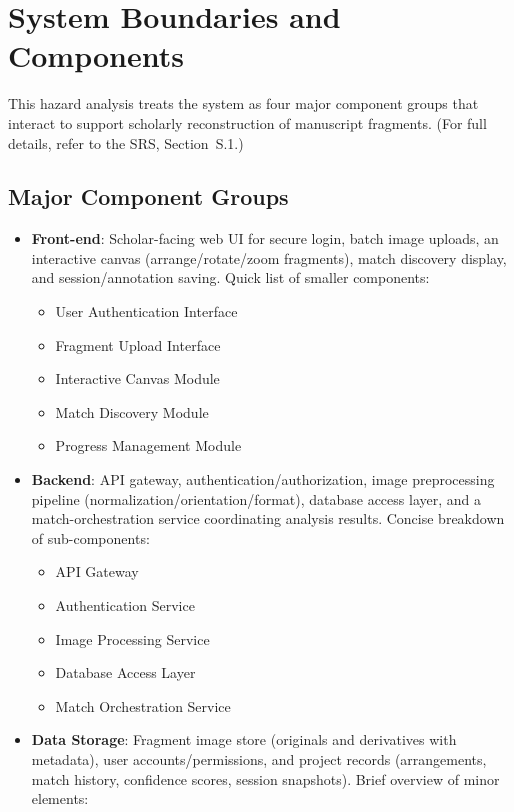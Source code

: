 \documentclass{article}
\begin{document}
\section{System Boundaries and Components}

This hazard analysis treats the system as four major component groups that interact to support scholarly reconstruction of manuscript fragments. (For full details, refer to the SRS, Section~S.1.)

\subsection*{Major Component Groups}
\begin{itemize}
  \item \textbf{Front-end}: Scholar-facing web UI for secure login, batch image uploads, an interactive canvas (arrange/rotate/zoom fragments), match discovery display, and session/annotation saving. Quick list of smaller components:
  \begin{itemize}
    \item User Authentication Interface
    \item Fragment Upload Interface
    \item Interactive Canvas Module
    \item Match Discovery Module
    \item Progress Management Module
  \end{itemize}
  \item \textbf{Backend}: API gateway, authentication/authorization, image preprocessing pipeline (normalization/orientation/format), database access layer, and a match-orchestration service coordinating analysis results. Concise breakdown of sub-components:
   \begin{itemize}
    \item API Gateway
    \item Authentication Service
    \item Image Processing Service
    \item Database Access Layer
    \item Match Orchestration Service
   \end{itemize}
  \item \textbf{Data Storage}: Fragment image store (originals and derivatives with metadata), user accounts/permissions, and project records (arrangements, match history, confidence scores, session snapshots). Brief overview of minor elements:
  \begin{itemize}

\end{itemize}
\end{itemize}
\end{document}
